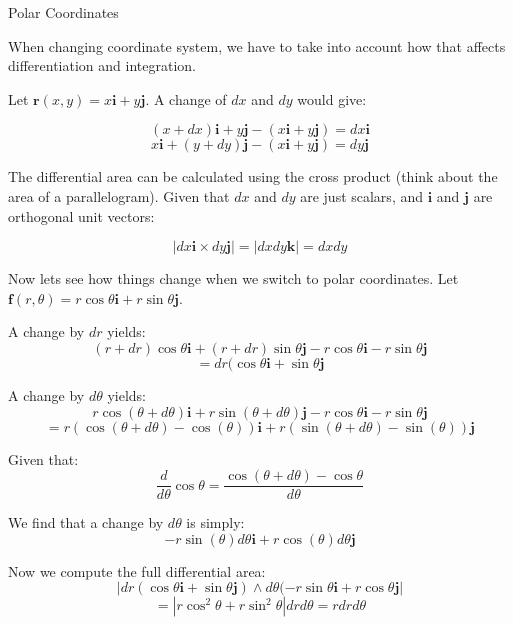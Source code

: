 \documentclass[a4paper,10pt]{article}
\begin{document}
Polar Coordinates

When changing coordinate system, we have to take into account how that affects
differentiation and integration.

Let $\mathbf{r}(x,y) = x \mathbf{i} + y \mathbf{j}$. A change of $dx$ and $dy$
would give:

\[ (x + dx)\mathbf{i} + y\mathbf{j} - (x\mathbf{i} + y\mathbf{j}) =
dx\mathbf{i} \]
\[ x\mathbf{i} + (y + dy)\mathbf{j} - (x\mathbf{i} + y\mathbf{j}) =
dy\mathbf{j} \]

The differential area can be calculated using the cross product (think about
the area of a parallelogram). Given that $dx$ and $dy$ are just scalars, and
$\mathbf{i}$ and $\mathbf{j}$ are orthogonal unit vectors:

\[ |dx\mathbf{i} \times dy\mathbf{j}| = |dxdy\mathbf{k}| = dxdy \]

Now lets see how things change when we switch to polar coordinates. Let
$\mathbf{f}(r,\theta) = r\cos\theta\mathbf{i} + r\sin\theta\mathbf{j}$.

A change by $dr$ yields:
\[ (r+dr)\cos\theta\mathbf{i} + (r+dr)\sin\theta\mathbf{j} -
r\cos\theta\mathbf{i} - r\sin\theta\mathbf{j} \]
\[ = dr(\cos\theta\mathbf{i} + \sin\theta\mathbf{j} \]

A change by $d\theta$ yields:
\[ r\cos(\theta + d\theta)\mathbf{i} + r\sin(\theta + d\theta)\mathbf{j} -
r\cos\theta\mathbf{i} - r\sin\theta\mathbf{j} \]
\[ = r\left(\cos(\theta + d\theta) - \cos(\theta)\right)\mathbf{i}
+ r\left(\sin(\theta + d\theta) - \sin(\theta)\right)\mathbf{j} \]

Given that:
\[ \frac{d}{d\theta} \cos\theta = \frac{\cos(\theta + d\theta) -
\cos\theta}{d\theta} \]

We find that a change by $d\theta$ is simply:
\[ -r\sin(\theta)d\theta \mathbf{i} + r\cos(\theta)d\theta \mathbf{j} \]

Now we compute the full differential area:
\[ | dr(\cos\theta \mathbf{i} + \sin\theta \mathbf{j}) \wedge
d\theta(-r \sin\theta \mathbf{i} + r\cos\theta \mathbf{j} | \]
\[ = | r\cos^2\theta + r\sin^2\theta | drd\theta = rdrd\theta \]
\end{document}
